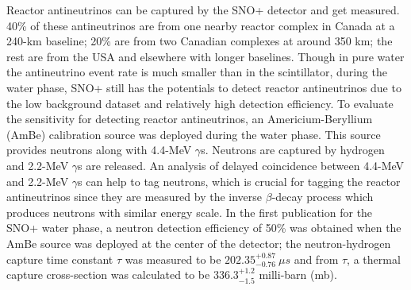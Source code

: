 Reactor antineutrinos can be captured by the SNO+ detector and get measured. 40\% of these antineutrinos are from one nearby reactor complex in Canada at a 240-km baseline; 20\% are from two Canadian complexes at around 350 km; the rest are from the USA and elsewhere with longer baselines\cite{whitepaper}. Though in pure water the antineutrino event rate is much smaller than in the scintillator, during the water phase, SNO+ still has the potentials to detect reactor antineutrinos due to the low background dataset and relatively high detection efficiency. To evaluate the sensitivity for detecting reactor antineutrinos, an Americium-Beryllium (AmBe) calibration source was deployed during the water phase. This source provides neutrons along with 4.4-MeV $\gamma$s. Neutrons are captured by hydrogen and 2.2-MeV $\gamma$s are released. An analysis of delayed coincidence between 4.4-MeV and 2.2-MeV $\gamma$s can help to tag neutrons, which is crucial for tagging the reactor antineutrinos since they are measured by the inverse $\beta$-decay process which produces neutrons with similar energy scale. In the first publication for the SNO+ water phase, a neutron detection efficiency of 50\% was obtained when the AmBe source was deployed at the center of the detector; the neutron-hydrogen capture time constant $\tau$ was measured to be $202.35_{-0.76}^{+0.87}~\mu s$ and from $\tau$, a thermal capture cross-section was calculated to be $336.3^{+1.2}_{-1.5}$ milli-barn (mb)\cite{anderson2020measurement}.

%
%



